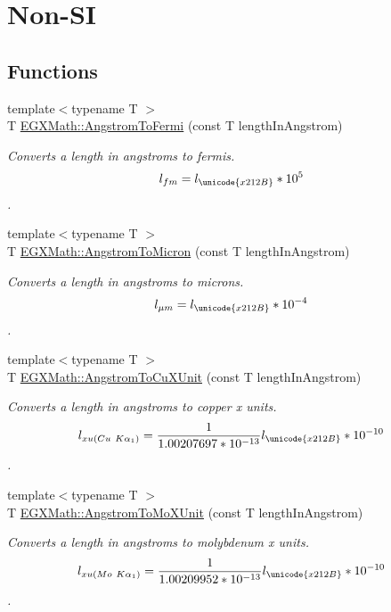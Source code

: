 \hypertarget{group___e_g_x_math-_conversions-_length_conversions-_non-_s_i-_angstrom-_non-_s_i}{}\section{Non-\/\+SI}
\label{group___e_g_x_math-_conversions-_length_conversions-_non-_s_i-_angstrom-_non-_s_i}
\subsection*{Functions}
\begin{DoxyCompactItemize}
\item 
{\footnotesize template$<$typename T $>$ }\\T \mbox{\hyperlink{group___e_g_x_math-_conversions-_length_conversions-_non-_s_i-_angstrom-_non-_s_i_ga651864e5c83caf88847a00a0b459eaa2}{E\+G\+X\+Math\+::\+Angstrom\+To\+Fermi}} (const T length\+In\+Angstrom)
\begin{DoxyCompactList}\small\item\em Converts a length in angstroms to fermis. \[ l_{fm}=l_{\unicode{x212B}} * 10^{5} \]. \end{DoxyCompactList}\item 
{\footnotesize template$<$typename T $>$ }\\T \mbox{\hyperlink{group___e_g_x_math-_conversions-_length_conversions-_non-_s_i-_angstrom-_non-_s_i_ga097787c82296d2767637cd15101ec272}{E\+G\+X\+Math\+::\+Angstrom\+To\+Micron}} (const T length\+In\+Angstrom)
\begin{DoxyCompactList}\small\item\em Converts a length in angstroms to microns. \[ l_{\mu m}=l_{\unicode{x212B}} * 10^{-4} \]. \end{DoxyCompactList}\item 
{\footnotesize template$<$typename T $>$ }\\T \mbox{\hyperlink{group___e_g_x_math-_conversions-_length_conversions-_non-_s_i-_angstrom-_non-_s_i_gaf42d486942a8441d13065d8e13661ec6}{E\+G\+X\+Math\+::\+Angstrom\+To\+Cu\+X\+Unit}} (const T length\+In\+Angstrom)
\begin{DoxyCompactList}\small\item\em Converts a length in angstroms to copper x units. \[ l_{xu(Cu\ K\alpha_1)}= \frac{1}{1.00207697*10^{-13}} l_{\unicode{x212B}} * 10^{-10}\]. \end{DoxyCompactList}\item 
{\footnotesize template$<$typename T $>$ }\\T \mbox{\hyperlink{group___e_g_x_math-_conversions-_length_conversions-_non-_s_i-_angstrom-_non-_s_i_ga197c8294d73fcc3171cd05fc595816c4}{E\+G\+X\+Math\+::\+Angstrom\+To\+Mo\+X\+Unit}} (const T length\+In\+Angstrom)
\begin{DoxyCompactList}\small\item\em Converts a length in angstroms to molybdenum x units. \[ l_{xu(Mo\ K\alpha_1)}=\frac{1}{1.00209952*10^{-13}} l_{\unicode{x212B}} * 10^{-10}\]. \end{DoxyCompactList}\end{DoxyCompactItemize}



